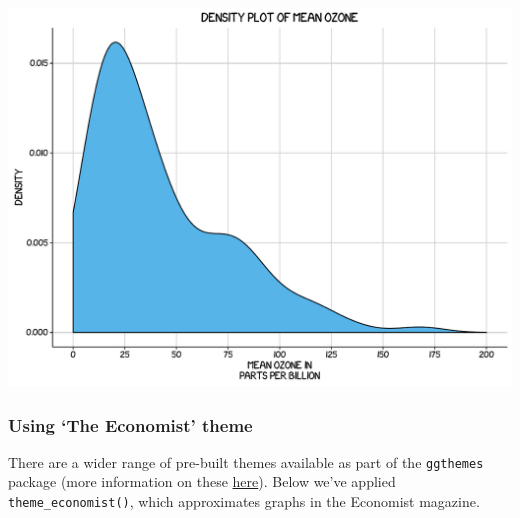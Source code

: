\documentclass[]{article}
\begin{document}
\begin{center}\includegraphics{0_all_posts_pdf/density_10-1} \end{center}

\subsubsection{\texorpdfstring{Using `The Economist'
theme}{Using The Economist theme}}\label{using-the-economist-theme-7}

There are a wider range of pre-built themes available as part of the
\texttt{ggthemes} package (more information on these
\href{https://cran.r-project.org/web/packages/ggthemes/vignettes/ggthemes.html}{here}).
Below we've applied \texttt{theme\_economist()}, which approximates
graphs in the Economist magazine.
\end{document}
